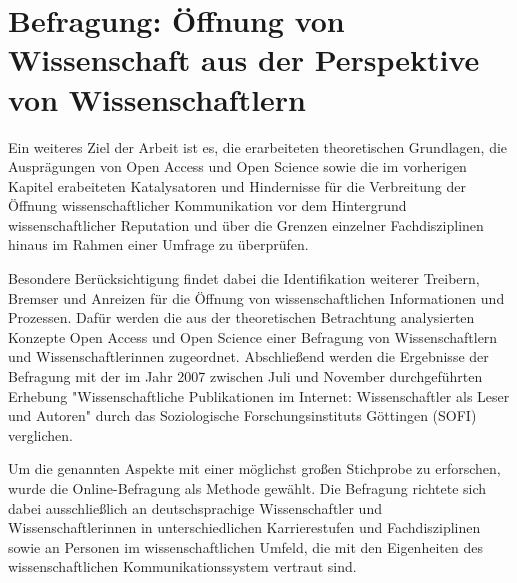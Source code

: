 \chapter{Befragung: Öffnung von Wissenschaft aus der Perspektive von Wissenschaftlern}

Ein weiteres Ziel der Arbeit ist es, die erarbeiteten theoretischen Grundlagen, die Ausprägungen von Open Access und Open Science sowie die im vorherigen Kapitel erabeiteten Katalysatoren und Hindernisse für die Verbreitung der Öffnung wissenschaftlicher Kommunikation vor dem Hintergrund wissenschaftlicher Reputation und über die Grenzen einzelner Fachdisziplinen hinaus im Rahmen einer Umfrage zu überprüfen.

Besondere Berücksichtigung findet dabei die Identifikation weiterer Treibern, Bremser und Anreizen für die Öffnung von wissenschaftlichen Informationen und Prozessen. Dafür werden die aus der theoretischen Betrachtung analysierten Konzepte Open Access und Open Science einer Befragung von Wissenschaftlern und Wissenschaftlerinnen zugeordnet. Abschließend werden die Ergebnisse der Befragung mit der im Jahr 2007 zwischen Juli und November durchgeführten Erhebung "Wissenschaftliche Publikationen im Internet: Wissenschaftler als Leser und Autoren" durch das Soziologische Forschungsinstituts Göttingen (SOFI) \cite{hanekop_2008} verglichen.

Um die genannten Aspekte mit einer möglichst großen Stichprobe zu erforschen, wurde die Online-Befragung als Methode gewählt. Die Befragung richtete sich dabei ausschließlich an deutschsprachige Wissenschaftler und Wissenschaftlerinnen in unterschiedlichen Karrierestufen und Fachdisziplinen sowie an Personen im wissenschaftlichen Umfeld, die mit den Eigenheiten des wissenschaftlichen Kommunikationssystem vertraut sind.

